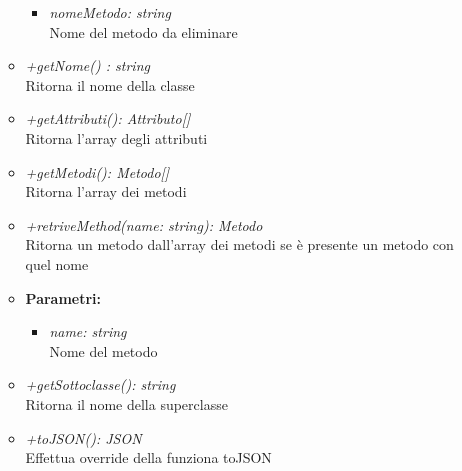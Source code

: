 \begin{itemize}
\begin{itemize}
            				\begin{itemize}
            					\item \emph{nomeMetodo: string}\\
            					Nome del metodo da eliminare
            				\end{itemize}
            			\item \emph{+getNome() : string}\\
            			Ritorna il nome della classe
            			\item \emph{+getAttributi(): Attributo[]}\\
            			Ritorna l'array degli attributi
            			\item \emph{+getMetodi(): Metodo[]}\\
            			Ritorna l'array dei metodi
            			\item \emph{+retriveMethod(name: string): Metodo}\\
            			Ritorna un metodo dall'array dei metodi se è presente un metodo con quel nome
            			\item \textbf{Parametri:}\\
            				\begin{itemize}
            					\item \emph{name: string}\\
            					Nome del metodo
            				\end{itemize}
            			\item \emph{+getSottoclasse(): string}\\
            			Ritorna il nome della superclasse
            			\item \emph{+toJSON(): JSON}\\ 
            			Effettua override della funziona toJSON
          			\end{itemize}
          		\end{itemize}
